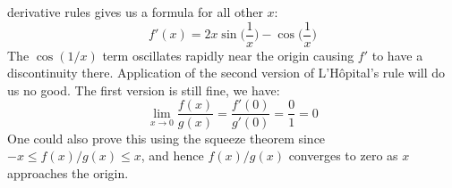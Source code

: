 \documentclass{article}
\theoremstyle{plain}
\begin{document}
    derivative rules gives us a formula for all other $x$:
    \begin{equation}
        f'(x)=2x\sin\Big(\frac{1}{x}\Big)-\cos\Big(\frac{1}{x}\Big)
    \end{equation}
    The $\cos(1/x)$ term oscillates rapidly near the origin causing $f'$ to
    have a discontinuity there. Application of the second version of
    L'H\^{o}pital's rule will do us no good. The first version is still fine,
    we have:
    \begin{equation}
        \lim_{x\rightarrow{0}}\frac{f(x)}{g(x)}
            =\frac{f'(0)}{g'(0)}
            =\frac{0}{1}
            =0
    \end{equation}
    One could also prove this using the squeeze theorem since
    $-x\leq{f}(x)/g(x)\leq{x}$, and hence $f(x)/g(x)$ converges to zero as
    $x$ approaches the origin.
\end{document}
